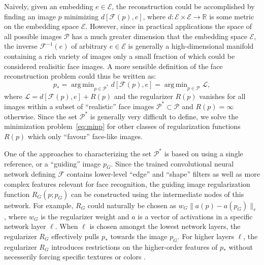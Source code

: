 \documentclass{article}
\def\F{\mc{F}}
\def\Img{p}
\def\ImgSpace{\mc{P}}
\def\ImgOpt{p_*}
\def\Faces{\mc{P}^*}
\def\GImg{\Img_G}
\def\Emb{e}
\def\EmbSpace{\mc{E}}
\def\Reg{R}
\def\GReg{\Reg_G}
\def\wG{w_G}
\def\Act{a}
\def\NetF{\mc{F}}
\def\Metric{d}
\def\R{\mathbb{R}}
\newcommand{\mc}[1]{\mathcal{#1}}
\newcommand{\argmin}{\mathop{\mathrm{arg\,min}}}
\begin{document}
  Naively, given an embedding $\Emb\in \EmbSpace$, the reconstruction could be accomplished by finding an image $\Img$ minimizing $\Metric\left[\NetF(\Img),\Emb\right]$, where $\Metric:\EmbSpace\times\EmbSpace\to \R$ is some metric on the embedding space $\EmbSpace$.
  However, since in practical applications the space of all possible images $\ImgSpace$ has a much greater dimension that the embedding space $\EmbSpace$, the inverse $\F^{-1}(\Emb)$ of arbitrary $\Emb\in \EmbSpace$ is generally a high-dimensional manifold containing a rich variety of images only a small fraction of which could be considered realisitic face images.
  A more sensible definition of the face reconstruction problem could thus be written as:
  \begin{equation}
       \label{eq:minp}
       \ImgOpt = \argmin_{\Img\in \Faces} \Metric\left[\NetF(\Img),\Emb\right]
       = \argmin_{\Img\in \ImgSpace} \mc{L},
  \end{equation}
  where $\mc{L} = \Metric\left[\NetF(\Img),\Emb\right] + \Reg(\Img)$ and the regularizer $\Reg(\Img)$ vanishes for all images within a subset of ``realistic'' face images $\Faces \subset \ImgSpace$ and $\Reg(\Img)=\infty$ otherwise.
  Since the set $\Faces$ is generally very difficult to define, we solve the minimization problem~\eqref{eq:minp} for other classes of regularization functions $\Reg(\Img)$ which only ``favour'' face-like images.

  One of the approaches to characterizing the set $\Faces$ is based on using a single reference, or a ``guiding'' image $\GImg$.
  Since the trained convolutional neural network defining $\NetF$ contains lower-level ``edge'' and ``shape'' filters as well as more complex features relevant for face recognition, the guiding image regularization function $\GReg(\Img;\GImg)$ can be constructed using the intermediate nodes of this network.
  For example, $\GReg$ could naturally be chosen as $\wG \|\Act(\Img)-\Act(\GImg)\|_r$, where $\wG$ is the regularizer weight and $\Act$ is a vector of activations in a specific network layer $\ell$.
  When $\ell$ is chosen amongst the lowest network layers, the regularizer $\GReg$ effectively pulls $\ImgOpt$ towards the image $\GImg$.
  For higher layers $\ell$, the regularizer $\GReg$ introduces restrictions on the higher-order features of $\ImgOpt$ without necesserily forcing specific textures or colors \cite{gatys:15}.
\end{document}
